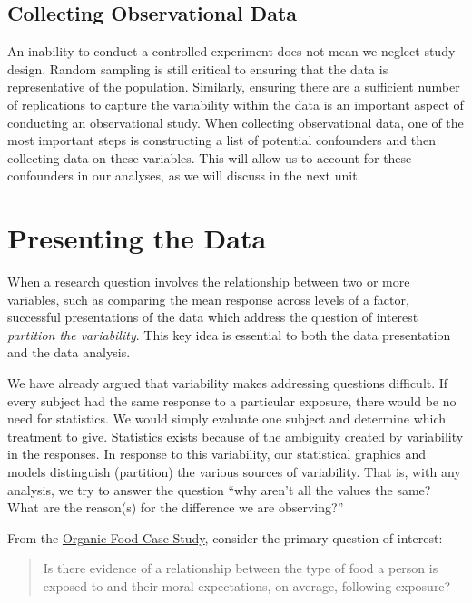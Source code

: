 \documentclass[]{book}
\theoremstyle{definition}
\theoremstyle{definition}
\theoremstyle{remark}
\begin{document}
\section{Collecting Observational
Data}\label{collecting-observational-data}

An inability to conduct a controlled experiment does not mean we neglect
study design. Random sampling is still critical to ensuring that the
data is representative of the population. Similarly, ensuring there are
a sufficient number of replications to capture the variability within
the data is an important aspect of conducting an observational study.
When collecting observational data, one of the most important steps is
constructing a list of potential confounders and then collecting data on
these variables. This will allow us to account for these confounders in
our analyses, as we will discuss in the next unit.

\chapter{Presenting the Data}\label{ANOVAsummaries}

When a research question involves the relationship between two or more
variables, such as comparing the mean response across levels of a
factor, successful presentations of the data which address the question
of interest \emph{partition the variability}. This key idea is essential
to both the data presentation and the data analysis.

We have already argued that variability makes addressing questions
difficult. If every subject had the same response to a particular
exposure, there would be no need for statistics. We would simply
evaluate one subject and determine which treatment to give. Statistics
exists because of the ambiguity created by variability in the responses.
In response to this variability, our statistical graphics and models
distinguish (partition) the various sources of variability. That is,
with any analysis, we try to answer the question ``why aren't all the
values the same? What are the reason(s) for the difference we are
observing?''

From the \protect\hyperlink{CaseOrganic}{Organic Food Case Study},
consider the primary question of interest:

\begin{quote}
Is there evidence of a relationship between the type of food a person is
exposed to and their moral expectations, on average, following exposure?
\end{quote}
\end{document}
